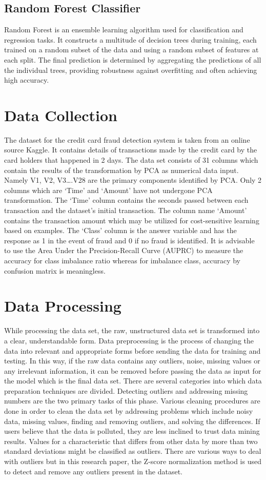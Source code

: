 \subsection{Random Forest Classifier}
Random Forest is an ensemble learning algorithm used for classification and regression tasks. It constructs a multitude of decision trees during training, each trained on a random subset of the data and using a random subset of features at each split. The final prediction is determined by aggregating the predictions of all the individual trees, providing robustness against overfitting and often achieving high accuracy.
 

\section{Data Collection}
The dataset for the credit card fraud detection system is taken from an online source Kaggle. It contains details of transactions made by the credit card by the card holders that happened in 2 days. The data set consists of 31 columns which contain the results of the transformation by PCA as numerical data input. Namely V1, V2, V3….V28 are the primary components identified by PCA. Only 2 columns which are ‘Time’ and ‘Amount’ have not undergone PCA transformation. The ‘Time’ column contains the seconds passed between each transaction and the dataset’s initial transaction. The column name ‘Amount’ contains the transaction amount which may be utilized for cost-sensitive learning based on examples. The ‘Class’ column is the answer variable and has the response as 1 in the event of fraud and 0 if no fraud is identified. It is advisable to use the Area Under the Precision-Recall Curve (AUPRC) to measure the accuracy for class imbalance ratio whereas for imbalance class, accuracy by confusion matrix is meaningless.

\section{Data Processing}
While processing the data set, the raw, unstructured data set is transformed into a clear, understandable form. Data preprocessing is the process of changing the data into relevant and appropriate forms before sending the data for training and testing. In this way, if the raw data contains any outliers, noise, missing values or any irrelevant information, it can be removed before passing the data as input for the model which is the final data set. There are several categories into which data preparation techniques are divided. Detecting outliers and addressing missing numbers are the two primary tasks of this phase. Various cleaning procedures are done in order to clean the data set by addressing problems which include noisy data, missing values, finding and removing outliers, and solving the differences. If users believe that the data is polluted, they are less inclined to trust data mining results. Values for a characteristic that differs from other data by more than two standard deviations might be classified as outliers. There are various ways to deal with outliers but in this research paper, the Z-score normalization method is used to detect and remove any outliers present in the dataset.


